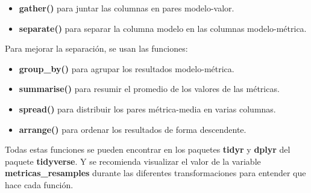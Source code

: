 \documentclass[]{article}
\newenvironment{Shaded}{\begin{snugshade}}{\end{snugshade}}
\newcommand{\DataTypeTok}[1]{\textcolor[rgb]{0.13,0.29,0.53}{#1}}
\newcommand{\KeywordTok}[1]{\textcolor[rgb]{0.13,0.29,0.53}{\textbf{#1}}}
\newcommand{\NormalTok}[1]{#1}
\newcommand{\OperatorTok}[1]{\textcolor[rgb]{0.81,0.36,0.00}{\textbf{#1}}}
\newcommand{\OtherTok}[1]{\textcolor[rgb]{0.56,0.35,0.01}{#1}}
\newcommand{\StringTok}[1]{\textcolor[rgb]{0.31,0.60,0.02}{#1}}
\begin{document}
\begin{itemize}
	\item \textbf{gather()} para juntar las columnas en pares modelo-valor.
	\item \textbf{separate()} para separar la columna modelo en las columnas modelo-métrica.
\end{itemize}

Para mejorar la separación, se usan las funciones: 


\begin{itemize}
	\item \textbf{group\_by()} para agrupar los resultados modelo-métrica.
	\item \textbf{summarise()} para resumir el promedio de los valores de las métricas.
	\item \textbf{spread()} para distribuir los pares métrica-media en varias columnas.
	\item \textbf{arrange()} para ordenar los resultados de forma descendente.
\end{itemize}

Todas estas funciones se pueden encontrar en los paquetes \textbf{tidyr} y \textbf{dplyr} del paquete \textbf{tidyverse}. Y se recomienda visualizar el valor de la variable \textbf{metricas\_resamples} durante las diferentes transformaciones para entender que hace cada función.

\vspace{1mm}

\begin{Shaded}
\end{Shaded}
\end{document}
